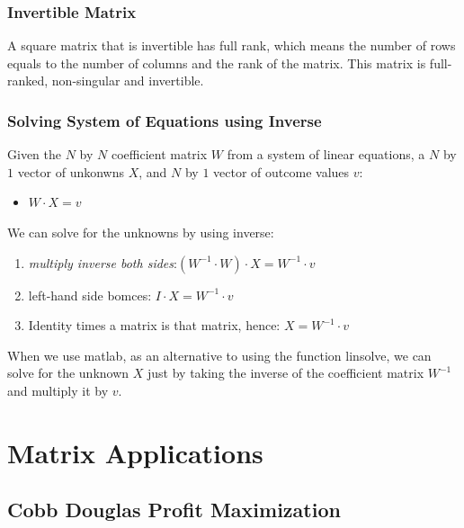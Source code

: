 \documentclass[
]{book}
\providecommand{\tightlist}{%
  \setlength{\itemsep}{0pt}\setlength{\parskip}{0pt}}
\begin{document}
\hypertarget{invertible-matrix}{%
\subsection{Invertible Matrix}\label{invertible-matrix}}

A square matrix that is invertible has full rank, which means the number
of rows equals to the number of columns and the rank of the matrix. This
matrix is full-ranked, non-singular and invertible.

\hypertarget{solving-system-of-equations-using-inverse}{%
\subsection{Solving System of Equations using Inverse}\label{solving-system-of-equations-using-inverse}}

Given the \(N\) by \(N\) coefficient matrix \(W\) from a system of linear
equations, a \(N\) by \(1\) vector of unkonwns \(X\), and \(N\) by \(1\) vector of
outcome values \(v\):

\begin{itemize}
\tightlist
\item
  \(\displaystyle W\cdot X=v\)
\end{itemize}

We can solve for the unknowns by using inverse:

\begin{enumerate}
\def\labelenumi{\arabic{enumi}.}
\item
  \emph{multiply inverse both
  sides}:\((W^{-1} \cdot W)\cdot X=W^{-1} \cdot v\)
\item
  left-hand side bomces: \(I\cdot X=W^{-1} \cdot v\)
\item
  Identity times a matrix is that matrix, hence: \(X=W^{-1} \cdot v\)
\end{enumerate}

When we use matlab, as an alternative to using the function linsolve, we
can solve for the unknown \(X\) just by taking the inverse of the
coefficient matrix \(W^{-1}\) and multiply it by \(v\).

\hypertarget{matrix-applications}{%
\chapter{Matrix Applications}\label{matrix-applications}}

\hypertarget{cobb-douglas-profit-maximization}{%
\section{Cobb Douglas Profit Maximization}\label{cobb-douglas-profit-maximization}}
\end{document}
